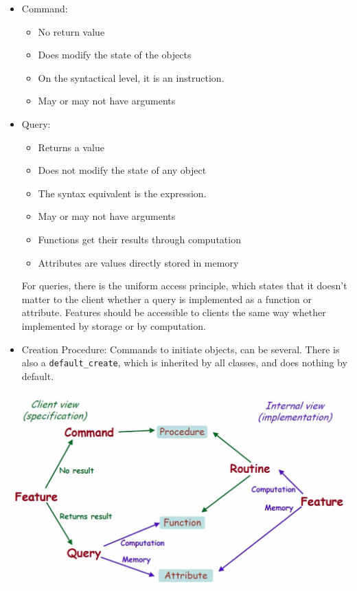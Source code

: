 \documentclass[a4paper]{article}
\newcommand{\inline}[1]{\lstinline!#1!}%
\begin{document}
\begin{itemize}
\begin{itemize}
\item Command: 
\begin{itemize}
\item No return value
\item Does modify the state of the objects
\item On the syntactical level, it is an instruction. 
\item May or may not have arguments
\end{itemize}
\item Query: 
\begin{itemize}
\item Returns a value
\item Does not modify the state of any object
\item The syntax equivalent is the expression.
\item May or may not have arguments
\item Functions get their results through computation
\item Attributes are values directly stored in memory
\end{itemize}
For queries, there is the uniform access principle, which states that it doesn't matter to the client whether a query is implemented as a function or attribute. Features should be accessible to clients the same way whether implemented by storage or by computation.
\item Creation Procedure: Commands to initiate objects, can be several. There is also a \inline{default_create}, which is inherited by all classes, and does nothing by default. 
\end{itemize}
\begin{center}
\includegraphics[scale=0.25]{Figures/featureQuery.jpg}
\end{center}

\end{itemize}
\end{document}
